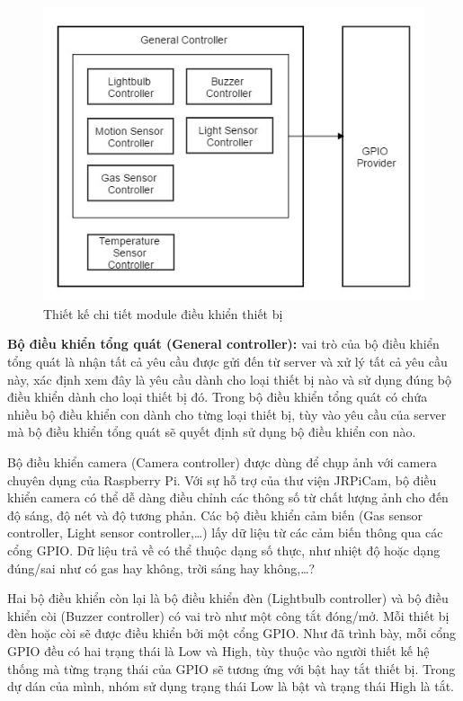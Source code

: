 \documentclass[12pt,a4paper,oneside]{extbook}
\begin{document}
\begin{figure}[h]
  \centering
     \includegraphics[scale=0.5]{4-module-dieu-khien-detail}
  \caption{Thiết kế chi tiết module điều khiển thiết bị}\label{fig:4-module-dieu-khien-detail}
\end{figure}

\textbf{Bộ điều khiển tổng quát (General controller):} vai trò của bộ điều khiển tổng quát là nhận tất cả yêu cầu được gửi đến từ server và xử lý tất cả yêu cầu này, xác định xem đây là yêu cầu dành cho loại thiết bị nào và sử dụng đúng bộ điều khiển dành cho loại thiết bị đó. Trong bộ điều khiển tổng quát có chứa nhiều bộ điều khiển con dành cho từng loại thiết bị, tùy vào yêu cầu của server mà bộ điều khiển tổng quát sẽ quyết định sử dụng bộ điều khiển con nào. 

Bộ điều khiển camera (Camera controller) được dùng để chụp ảnh với camera chuyên dụng của Raspberry Pi. Với sự hỗ trợ của thư viện JRPiCam, bộ điều khiển camera có thể dễ dàng điều chỉnh các thông số từ chất lượng ảnh cho đến độ sáng, độ nét và độ tương phản. Các bộ điều khiển cảm biến (Gas sensor controller, Light sensor controller,\dots) lấy dữ liệu từ các cảm biến thông qua các cổng GPIO. Dữ liệu trả về có thể thuộc dạng số thực, như nhiệt độ hoặc dạng đúng/sai như có gas hay không, trời sáng hay không,\dots ?

Hai bộ điều khiển còn lại là bộ điều khiển đèn (Lightbulb controller) và bộ điều khiển còi (Buzzer controller) có vai trò như một công tắt đóng/mở. Mỗi thiết bị đèn hoặc còi sẽ được điều khiển bởi một cổng GPIO. Như đã trình bày, mỗi cổng GPIO đều có hai trạng thái là Low và High, tùy thuộc vào người thiết kế hệ thống mà từng trạng thái của GPIO sẽ tương ứng với bật hay tắt thiết bị. Trong dự dán của mình, nhóm sử dụng trạng thái Low là bật và trạng thái High là tắt.
\end{document}
